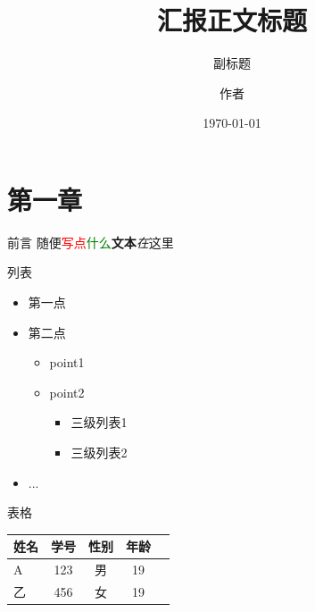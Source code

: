 \documentclass{beamer}
\begin{document}
\title{汇报正文标题}
\subtitle{副标题}
\author{作者}
\date{\today}

\maketitle

\section{第一章}
\begin{frame}{前言}
    \centering
    随便\textcolor{red}{写点}\textcolor{green}{什么}\textbf{文本}\textit{在}这里
\end{frame}

\begin{frame}{列表}
    \begin{itemize}
        \item 第一点
        \item 第二点
        \begin{itemize}
            \item point1
            \item point2
            \begin{itemize}
                \item 三级列表1
                \item 三级列表2
            \end{itemize}
        \end{itemize}
        \item ...
    \end{itemize}
\end{frame}

\begin{frame}{表格}
    \begin{table}
        \centering
        \begin{tabular}{lcccc}
            \toprule
            姓名 & 学号 & 性别 & 年龄 \\
            \midrule
            A & 123 & 男 & 19 \\
            乙 & 456 & 女 & 19 \\
            \bottomrule
        \end{tabular}
    \end{table}
\end{frame}
\end{document}

